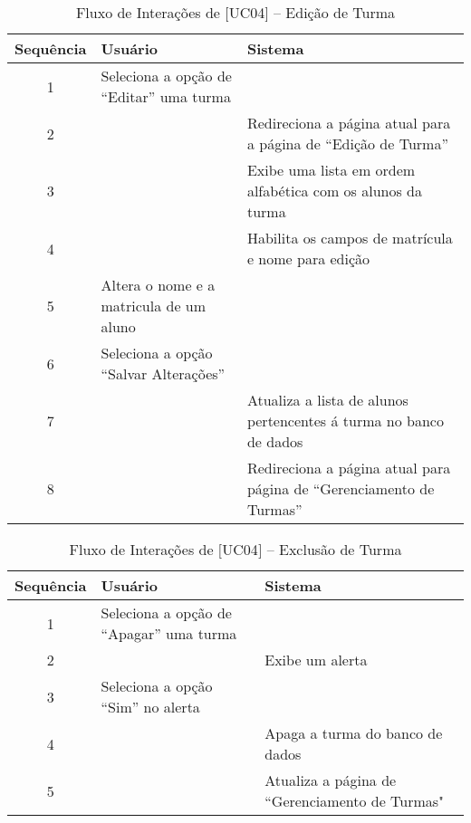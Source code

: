 \begin{itemize}
\begin{itemize}
        \begin{table}[H]
            \centering
            \caption{Fluxo de Interações de $[$UC04$]$ -- Edição de Turma}
            \vspace{0.5cm}
            \renewcommand\arraystretch{1.5}
            \begin{tabular}{c|p{6cm}|p{6cm}}
             
                \textbf{Sequência} & \textbf{Usuário} & \textbf{Sistema} \\ %
                \hline                               %
                1 & Seleciona a opção de “Editar” uma turma  &  \\
                2 & & Redireciona a página atual para a página de “Edição de Turma” \\
                3 & & Exibe uma lista em ordem alfabética com os alunos da turma \\
                4 & & Habilita os campos de matrícula e nome para edição \\
                5 & Altera o nome e a matricula de um aluno & \\
                6 & Seleciona a opção “Salvar Alterações” & \\
                7 & & Atualiza a lista de alunos pertencentes á turma no banco de dados \\
                8 & & Redireciona a página atual para página de “Gerenciamento de Turmas” 
                \\
                \hline
            \end{tabular}
        \end{table}
        
        \begin{table}[H]
            \centering
            \caption{Fluxo de Interações de $[$UC04$]$ -- Exclusão de Turma}
            \vspace{0.5cm}
            \renewcommand\arraystretch{1.5}
            \begin{tabular}{c|p{6cm}|p{6cm}}
             
                \textbf{Sequência} & \textbf{Usuário} & \textbf{Sistema} \\ %
                \hline                               %
                1 & Seleciona a opção de “Apagar” uma turma  &  \\
                2 &   & Exibe um alerta \\
                3 & Seleciona a opção “Sim” no alerta &   \\
                4 & & Apaga a turma do banco de dados \\
                5 & & Atualiza a página de “Gerenciamento de Turmas"
                \\
                \hline
            \end{tabular}
        \end{table}
        

\end{itemize}
\end{itemize}
